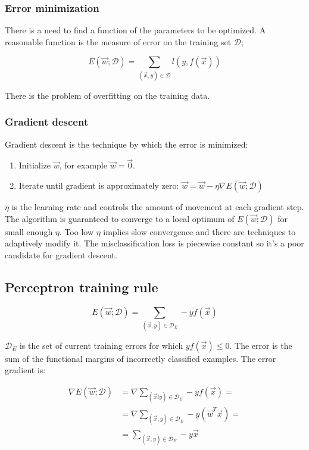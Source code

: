 		\subsubsection{Error minimization}
		There is a need to find a function of the parameters to be optimized.
		A reasonable function is the measure of error on the training set $\mathcal{D}$;

		$$E(\vec{w};\mathcal{D}) = \sum\limits_{(\vec{x}, y)\in\mathcal{D}}l(y, f(\vec{x}))$$

		There is the problem of overfitting on the training data.

		\subsubsection{Gradient descent}
		Gradient descent is the technique by which the error is minimized:

		\begin{multicols}{2}
			\begin{enumerate}
				\item Initialize $\vec{w}$, for example $\vec{w} = \vec{0}$.
				\item Iterate until gradient is approximately zero: $\vec{w} = \vec{w}-\eta\nabla E(\vec{w};\mathcal{D})$
			\end{enumerate}
		\end{multicols}

		$\eta$ is the learning rate and controls the amount of movement at each gradient step.
		The algorithm is guaranteed to converge to a local optimum of $E(\vec{w};\mathcal{D})$ for small enough $\eta$.
		Too low $\eta$ implies slow convergence and there are techniques to adaptively modify it.
		The misclassification loss is piecewise constant so it's a poor candidate for gradient descent.

	\subsection{Perceptron training rule}

	$$E(\vec{w};\mathcal{D}) = \sum\limits_{(\vec{x}, y)\in\mathcal{D}_E}-yf(\vec{x})$$

	$\mathcal{D}_E$ is the set of current training errors for which $yf(\vec{x}) \le 0$.
	The error is the sum of the functional margins of incorrectly classified examples.
	The error gradient is:

	\begin{align*}
		\nabla E(\vec{w};\mathcal{D}) &= \nabla\sum\limits_{(\vec{x}ly)\in\mathcal{D}_E}-yf(\vec{x})=\\
																	&=\nabla\sum\limits_{(\vec{x},y)\in\mathcal{D}_E}-y(\vec{w}^T\vec{x})=\\
																	&=\sum\limits_{(\vec{x},y)\in\mathcal{D}_E}-y\vec{x}
	\end{align*}

